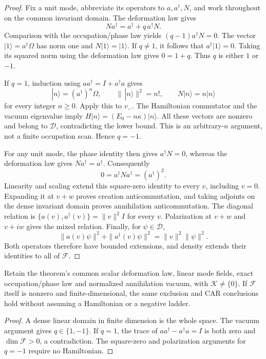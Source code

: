 \begin{proof}
Fix a unit mode, abbreviate its operators to $a,a^\dagger,N$, and work
throughout on the common invariant domain. The deformation law gives
\[
 Na^\dagger=a^\dagger+q\,a^\dagger N.
\]
Comparison with the occupation/phase law yields
$(q-1)a^\dagger N=0$. The vector $|1\rangle=a^\dagger\Omega$
has norm one and $N|1\rangle=|1\rangle$. If $q\ne1$, it follows that
$a^\dagger|1\rangle=0$. Taking its squared norm using the deformation
law gives $0=1+q$. Thus $q$ is either $1$ or $-1$.

If $q=1$, induction using $aa^\dagger=I+a^\dagger a$ gives
\[
 |n\rangle=(a^\dagger)^n\Omega,\qquad
 \|\,|n\rangle\|^2=n!,\qquad N|n\rangle=n|n\rangle
\]
for every integer $n\geq0$. Apply this to $v_-$. The Hamiltonian
commutator and the vacuum eigenvalue imply
$H|n\rangle=(E_0-n\kappa)|n\rangle$. All these vectors are nonzero
and belong to $\mathcal D$, contradicting the lower bound. This is an
arbitrary-$n$ argument, not a finite occupation scan. Hence $q=-1$.

For any unit mode, the phase identity then gives $a^\dagger N=0$,
whereas the deformation law gives $Na^\dagger=a^\dagger$. Consequently
\[
 0=a^\dagger Na^\dagger=(a^\dagger)^2.
\]
Linearity and scaling extend this square-zero identity to every $v$,
including $v=0$. Expanding it at $v+w$ proves creation
anticommutation, and taking adjoints on the dense invariant domain proves
annihilation anticommutation. The diagonal relation is
$\{a(v),a^\dagger(v)\}=\|v\|^2I$ for every $v$. Polarization at
$v+w$ and $v+iw$ gives the mixed relation. Finally, for
$\psi\in\mathcal D$,
\[
 \|a(v)\psi\|^2+\|a^\dagger(v)\psi\|^2
   =\|v\|^2\|\psi\|^2.
\]
Both operators therefore have bounded extensions, and density extends
their identities to all of $\mathcal F$.
\end{proof}

\begin{corollary}
\label{cor:pauli-finite-capacity-selection}
Retain the theorem's common scalar deformation law, linear mode fields,
exact occupation/phase law and normalized annihilation vacuum, with
$\mathcal K\ne\{0\}$. If $\mathcal F$ itself is nonzero and
finite-dimensional, the same exclusion
and CAR conclusions hold without assuming a Hamiltonian or a negative
ladder.
\end{corollary}
\begin{proof}
A dense linear domain in finite dimension is the whole space. The
vacuum argument gives $q\in\{1,-1\}$. If $q=1$, the trace of
$aa^\dagger-a^\dagger a=I$ is both zero and
$\dim\mathcal F>0$, a contradiction. The square-zero and polarization
arguments for $q=-1$ require no Hamiltonian.
\end{proof}

